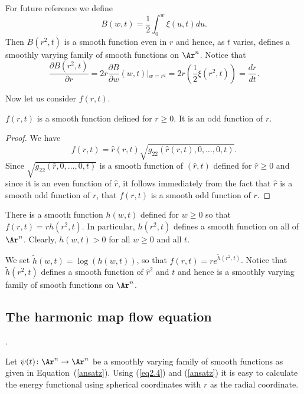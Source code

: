 For future reference we define
\begin{equation}\label{Bdefn}
B(w,t)=\frac{1}{2}\int_0^w\xi(u,t)du. \end{equation} Then $B(r^2,t)$
is a smooth function even in $r$ and hence, as $t$ varies, defines a
smoothly varying family of smooth functions on $\Ar^n$. Notice that
$$\frac{\partial B(r^2,t)}{\partial r}=2r\frac{\partial B}{\partial
w}(w,t)\left|_{w=r^2}\right.=2r\left(\frac{1}{2}\xi(r^2,t)\right)=\frac{dr}{dt}.$$

Now let us consider $f(r,t)$.

\begin{claim}
\label{claim:f-odd-smooth-function}
$f(r,t)$ is a smooth function defined for $r\ge 0$. It is an odd
function of $r$.
\end{claim}


\begin{proof}
We have
$$f(r,t)=\hat r(r,t)\sqrt{g_{22}(\hat r(r,t),0,\ldots,0,t)}.$$
Since $\sqrt{g_{22}(\hat r,0,\ldots,0,t)}$ is a smooth function of
$(\hat r,t)$ defined for $\hat r\ge 0$ and since it is an  even
function of $\hat r$, it follows immediately from the fact that
$\hat r$ is a smooth odd function of $r$, that $f(r,t)$ is a smooth
odd function of $r$.
\end{proof}


\begin{corollary}[Factorization $f(r,t)=r\,h(r^2,t)$]
\label{cor:f-factorization-rh}
There is a smooth function $h(w,t)$ defined for $w\ge 0$ so that
$f(r,t)=rh(r^2,t)$. In particular, $h(r^2,t)$ defines a smooth
function on all of $\Ar^n$. Clearly, $h(w,t)>0$ for all $w\ge 0$ and
all $t$.
\end{corollary}

We set $\tilde h(w,t)=\log(h(w,t))$, so that $f(r,t)=re^{\tilde
h(r^2,t)}$. Notice that $\tilde h(r^2,t)$ defines a smooth function
of $\hat r^2$ and $t$ and hence is a smoothly varying family of
smooth functions on $\Ar^n$.



\subsection{The harmonic map flow equation}.

Let $\psi(t)\colon \Ar^n\to \Ar^n$ be a smoothly varying family of
smooth functions as given in Equation~(\ref{ansatz}). Using
(\ref{eq2.4}) and (\ref{ansatz}) it is easy to calculate the energy
functional using spherical coordinates with $r$ as the radial
coordinate.



